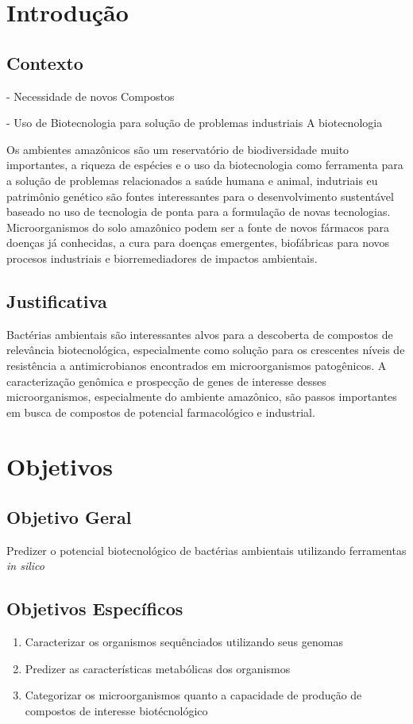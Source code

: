 \chapter{Introdução}
\label{cap:introducao}

\section{Contexto}


- Necessidade de novos Compostos

- Uso de Biotecnologia para solução de problemas industriais
A biotecnologia 

Os ambientes amazônicos são um reservatório de biodiversidade muito importantes,
a riqueza de espécies e o uso da biotecnologia como ferramenta para a solução de problemas relacionados
a saúde humana e animal, indutriais eu patrimônio genético são fontes interessantes para o
desenvolvimento sustentável baseado no uso de tecnologia de ponta para a formulação de novas tecnologias.
Microorganismos do solo amazônico podem ser a fonte de novos fármacos para doenças já conhecidas,
a cura para doenças emergentes, biofábricas para novos procesos industriais e biorremediadores
de impactos ambientais.

\section{Justificativa}
Bactérias ambientais são interessantes alvos para a descoberta de compostos
de relevância biotecnológica, especialmente como solução para os crescentes níveis
de resistência a antimicrobianos encontrados em microorganismos patogênicos.
A caracterização genômica e prospecção de genes de interesse desses microorganismos,
especialmente do ambiente amazônico, são passos importantes
em busca de compostos de potencial farmacológico e industrial.

\chapter{Objetivos}

\section{Objetivo Geral}

Predizer o potencial biotecnológico de bactérias ambientais utilizando 
ferramentas \textit{in silico} 

\section{Objetivos Específicos}
\begin{enumerate}
    \item Caracterizar os organismos sequênciados utilizando seus genomas
    \item Predizer as características metabólicas dos organismos
    \item Categorizar os microorganismos quanto a capacidade de produção de compostos de interesse biotécnológico
\end{enumerate}





